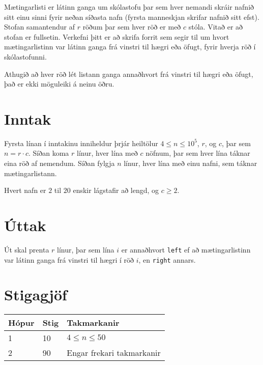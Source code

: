 
Mætingarlisti er látinn ganga um skólastofu þar sem hver nemandi skráir nafnið sitt einu sinni fyrir neðan
síðasta nafn (fyrsta manneskjan skrifar nafnið sitt efst). Stofan samantendur af $r$ röðum þar sem hver röð
er með $c$ stóla. Vitað er að stofan er fullsetin. Verkefni þitt er að skrifa forrit sem segir til um hvort
mætingarlistinn var látinn ganga frá vinstri til hægri eða öfugt, fyrir hverja röð í skólastofunni.

Athugið að hver röð lét listann ganga annaðhvort frá vinstri til hægri eða öfugt, það er ekki möguleiki á neinu öðru.

\section*{Inntak}
Fyrsta línan í inntakinu inniheldur þrjár heiltölur 
$4 \leq n \leq 10^5$,
$r$, og $c$, þar sem $n = r \cdot c$.
Síðan koma $r$ línur, hver lína með $c$ nöfnum, þar sem hver lína táknar eina röð af nemendum.
Síðan fylgja $n$ línur, hver lína með einu nafni, sem táknar mætingarlistann.

Hvert nafn er $2$ til $20$ enskir lágstafir að lengd, og $c \geq 2$.


\section*{Úttak}
Út skal prenta $r$ línur, þar sem lína $i$ er annaðhvort \texttt{left} ef að mætingarlistinn var látinn ganga
frá vinstri til hægri í röð $i$, en \texttt{right} annars.

\section*{Stigagjöf}
\begin{tabular}{|l|l|l|}
\hline
Hópur & Stig & Takmarkanir \\ \hline
1     & 10  & $4 \leq n \leq 50$\\
\hline
2     & 90  & Engar frekari takmarkanir \\
\hline
\end{tabular}
